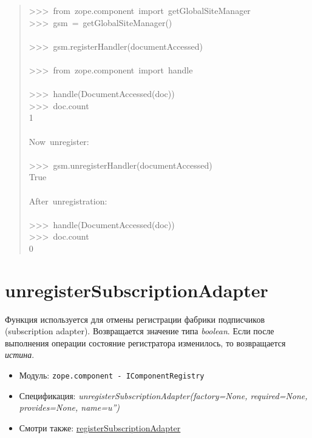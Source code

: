 \documentclass[14pt,a4paper,openany,twoside,final]{extbook}
\providecommand*{\DUroletitlereference}[1]{\textsl{#1}}
\begin{document}
\begin{quote}
{>{}>{}>~from~zope.component~import~getGlobalSiteManager\\
>{}>{}>~gsm~=~getGlobalSiteManager()\\
~\\
>{}>{}>~gsm.registerHandler(documentAccessed)\\
~\\
>{}>{}>~from~zope.component~import~handle\\
~\\
>{}>{}>~handle(DocumentAccessed(doc))\\
>{}>{}>~doc.count\\
1\\
~\\
Now~unregister:\\
~\\
>{}>{}>~gsm.unregisterHandler(documentAccessed)\\
True\\
~\\
After~unregistration:\\
~\\
>{}>{}>~handle(DocumentAccessed(doc))\\
>{}>{}>~doc.count\\
0
}
\end{quote}


\section*{unregisterSubscriptionAdapter%
  \label{unregistersubscriptionadapter}%
}

Функция используется для отмены регистрации фабрики подписчиков
(subscription adapter).  Возвращается значение типа \DUroletitlereference{boolean}. Если
после выполнения операции состояние регистратора изменилось, то
возвращается \DUroletitlereference{истина}.

\begin{itemize}

\item Модуль: \texttt{zope.component - IComponentRegistry}

\item Спецификация: \DUroletitlereference{unregisterSubscriptionAdapter(factory=None,
required=None, provides=None, name=u'')}

\item Смотри также: \hyperref[registersubscriptionadapter]{registerSubscriptionAdapter}

\end{itemize}
\end{document}
